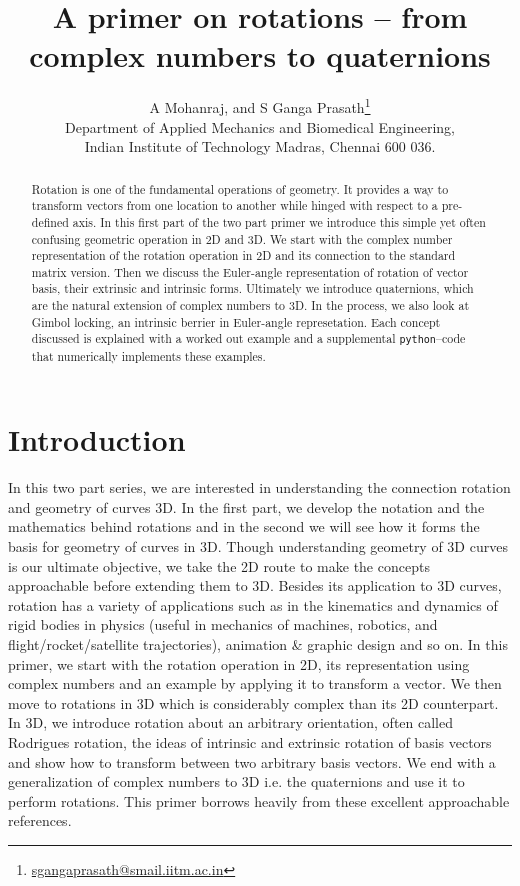 \documentclass{article}
\title{A primer on rotations -- from complex numbers to quaternions}
\author{A Mohanraj, and S Ganga Prasath\footnote{\href{emailto:sgangaprasath@smail.iitm.ac.in}{sgangaprasath@smail.iitm.ac.in}} \\
Department of Applied Mechanics and Biomedical Engineering,\\
Indian Institute of Technology Madras, Chennai 600 036.}
\date{}
\begin{document}
\maketitle
\begin{abstract}
Rotation is one of the fundamental operations of geometry. It provides a way to transform vectors from one location to another while hinged with respect to a pre-defined axis. In this first part of the two part primer we introduce this simple yet often confusing geometric operation in 2D and 3D. We start with the complex number representation of the rotation operation in 2D and its connection to the standard matrix version. Then we discuss the Euler-angle representation of rotation of vector basis, their extrinsic and intrinsic forms. Ultimately we introduce quaternions, which are the natural extension of complex numbers to 3D. In the process, we also look at Gimbol locking, an intrinsic berrier in Euler-angle represetation. Each concept discussed is explained with a worked out example and a supplemental \texttt{python}--code that numerically implements these examples.
\end{abstract}


\section{Introduction}
In this two part series, we are interested in understanding the connection rotation and geometry of curves 3D. In the first part, we develop the notation and the mathematics behind rotations and in the second we will see how it forms the basis for geometry of curves in 3D. Though understanding geometry of 3D curves is our ultimate objective, we take the 2D route to make the concepts approachable before extending them to 3D. Besides its application to 3D curves, rotation has a variety of applications such as in the kinematics and dynamics of rigid bodies in physics (useful in mechanics of machines, robotics, and flight/rocket/satellite trajectories), animation \& graphic design and so on. In this primer, we start with the rotation operation in 2D, its representation using complex numbers and an example by applying it to transform a vector. We then move to rotations in 3D which is considerably complex than its 2D counterpart. In 3D, we introduce rotation about an arbitrary orientation, often called Rodrigues rotation, the ideas of intrinsic and extrinsic rotation of basis vectors and show how to transform between two arbitrary basis vectors. We end with a generalization of complex numbers to 3D i.e. the quaternions and use it to perform rotations. This primer borrows heavily from these \cite{hanson2005visualizing,vince2008geometric,vince2006mathematics} excellent approachable references.
\end{document}
